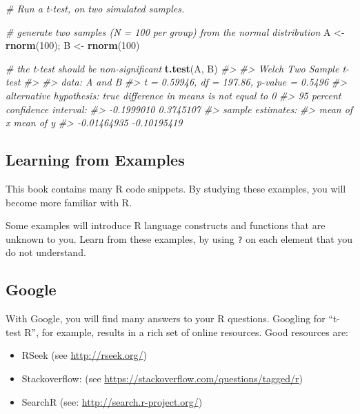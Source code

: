\documentclass[]{book}
\newenvironment{Shaded}{\begin{snugshade}}{\end{snugshade}}
\newcommand{\KeywordTok}[1]{\textcolor[rgb]{0.13,0.29,0.53}{\textbf{#1}}}
\newcommand{\DecValTok}[1]{\textcolor[rgb]{0.00,0.00,0.81}{#1}}
\newcommand{\StringTok}[1]{\textcolor[rgb]{0.31,0.60,0.02}{#1}}
\newcommand{\CommentTok}[1]{\textcolor[rgb]{0.56,0.35,0.01}{\textit{#1}}}
\newcommand{\NormalTok}[1]{#1}
\begin{document}
\begin{Shaded}
\begin{Highlighting}[]
\CommentTok{# Run a t-test, on two simulated samples.}

\CommentTok{# generate two samples (N = 100 per group) from the normal distribution}
\NormalTok{A <-}\StringTok{ }\KeywordTok{rnorm}\NormalTok{(}\DecValTok{100}\NormalTok{); B <-}\StringTok{ }\KeywordTok{rnorm}\NormalTok{(}\DecValTok{100}\NormalTok{)}

\CommentTok{# the t-test should be non-significant }
\KeywordTok{t.test}\NormalTok{(A, B)}
\CommentTok{#> }
\CommentTok{#>  Welch Two Sample t-test}
\CommentTok{#> }
\CommentTok{#> data:  A and B}
\CommentTok{#> t = 0.59946, df = 197.86, p-value = 0.5496}
\CommentTok{#> alternative hypothesis: true difference in means is not equal to 0}
\CommentTok{#> 95 percent confidence interval:}
\CommentTok{#>  -0.1999010  0.3745107}
\CommentTok{#> sample estimates:}
\CommentTok{#>   mean of x   mean of y }
\CommentTok{#> -0.01464935 -0.10195419}
\end{Highlighting}
\end{Shaded}

\subsection{Learning from Examples}\label{learning-from-examples}

This book contains many R code snippets. By studying these examples, you
will become more familiar with R.

Some examples will introduce R language constructs and functions that
are unknown to you. Learn from these examples, by using \texttt{?} on
each element that you do not understand.

\subsection{Google}\label{google}

With Google, you will find many answers to your R questions. Googling
for ``t-test R'', for example, results in a rich set of online
resources. Good resources are:

\begin{itemize}
\item
  RSeek (see \url{http://rseek.org/})
\item
  Stackoverflow: (see
  \url{https://stackoverflow.com/questions/tagged/r})
\item
  SearchR (see: \url{http://search.r-project.org/})
\end{itemize}
\end{document}
